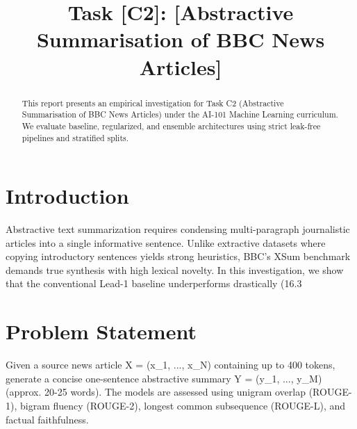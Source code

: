 \documentclass[conference]{IEEEtran}
\begin{document}
\title{Task [C2]: [Abstractive Summarisation of BBC News Articles]}

\author{
}

\maketitle

\begin{abstract}
This report presents an empirical investigation for Task C2 (Abstractive Summarisation of BBC News Articles) under the AI-101 Machine Learning curriculum. We evaluate baseline, regularized, and ensemble architectures using strict leak-free pipelines and stratified splits.
\end{abstract}

\section{Introduction}
Abstractive text summarization requires condensing multi-paragraph journalistic articles into a single informative sentence. Unlike extractive datasets where copying introductory sentences yields strong heuristics, BBC's XSum benchmark demands true synthesis with high lexical novelty. In this investigation, we show that the conventional Lead-1 baseline underperforms drastically (16.3%

\section{Problem Statement}
Given a source news article X = (x_1, ..., x_N) containing up to 400 tokens, generate a concise one-sentence abstractive summary Y = (y_1, ..., y_M) (approx. 20-25 words). The models are assessed using unigram overlap (ROUGE-1), bigram fluency (ROUGE-2), longest common subsequence (ROUGE-L), and factual faithfulness.
\end{document}

